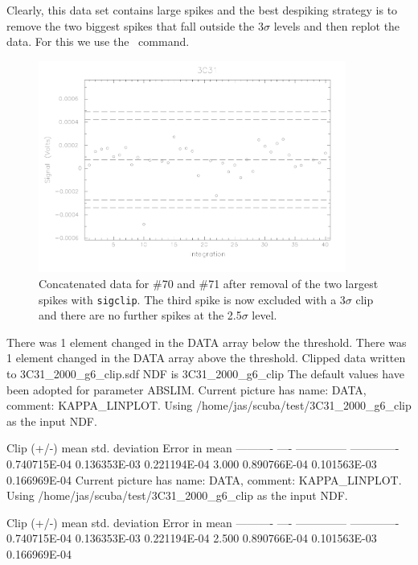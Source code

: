 \documentclass[twoside,11pt,fleqn,noabs]{starlink}
\providecommand{\task}[1]{\textsf{#1}}
\providecommand{\sigclip}{\xref{\task{sigclip}}{sun216}{SIGCLIP}}
\begin{document}
Clearly, this data set contains large spikes and the best despiking
strategy is to remove the two biggest spikes that fall outside the
3$\sigma$ levels and then replot the data. For this we use the
\sigclip\ command.

\begin{figure}[t]
\begin{center}
\includegraphics[width=0.9\textwidth]{sc10_fig2}
\end{center}
\caption[Concatenated data after spike removal.]{Concatenated data for \#70 and \#71 after removal of the
two largest spikes with \texttt{sigclip}. The third spike is now excluded
with a 3$\sigma$ clip and there are no further spikes at the 2.5$\sigma$ level.}
\label{f2}
\end{figure}

\begin{small}
\begin{terminalv}
There was 1 element changed in the DATA array below the threshold.
There was 1 element changed in the DATA array above the threshold.
Clipped data written to 3C31_2000_g6_clip.sdf
NDF is 3C31_2000_g6_clip
The default values have been adopted for parameter ABSLIM.
Current picture has name: DATA, comment: KAPPA_LINPLOT.
Using /home/jas/scuba/test/3C31_2000_g6_clip as the input NDF.

      Clip (+/-)         mean          std. deviation    Error in mean
      ----------         ----          --------------    -------------
                      0.740715E-04      0.136353E-03      0.221194E-04
         3.000        0.890766E-04      0.101563E-03      0.166969E-04
%
Current picture has name: DATA, comment: KAPPA_LINPLOT.
Using /home/jas/scuba/test/3C31_2000_g6_clip as the input NDF.

      Clip (+/-)         mean          std. deviation    Error in mean
      ----------         ----          --------------    -------------
                      0.740715E-04      0.136353E-03      0.221194E-04
         2.500        0.890766E-04      0.101563E-03      0.166969E-04
\end{terminalv}
\end{small}
\end{document}
